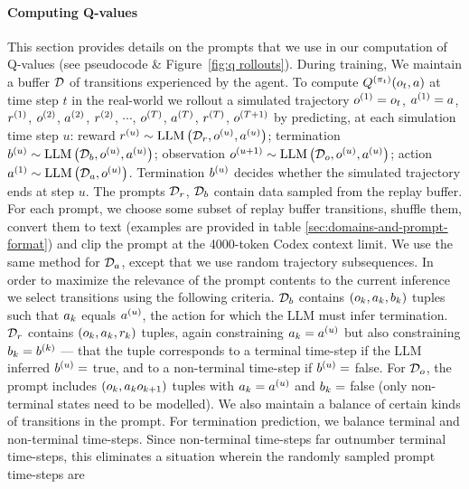 \documentclass{article}
\DeclareMathOperator*{\LLM}{LLM}
\begin{document}
\paragraph{Computing Q-values}\label{para:q-values} This section provides
details on the prompts that we use in our computation of Q-values (see
 pseudocode \& Figure~\ref{fig:q rollouts}). During training, We
maintain a buffer $\mathcal{D}$ of transitions experienced by the agent. To compute
$\Q^{\Policy_t}(\Obs_t, \Act)$ at time step $t$ in the real-world we rollout a
simulated trajectory $\Obs^{1}=\Obs_t$, $\Act^{1} = \Act$, $\Rew^{1}$,
$\Obs^{2}$, $\Act^{2}$, $\Rew^{2}$, $\cdots$, $\Obs^{T}$, $\Act^{T}$,
$\Rew^{T}$, $\Obs^{T+1}$ by predicting, at each simulation time step $u$: reward
$\Rew^{u} \sim \LLM\left( \Buffer_{\Rew},\Obs^{u},\Act^{u} \right)$; termination
$\Ter^{u} \sim \LLM\left( \Buffer_{\Ter},\Obs^{u},\Act^{u} \right)$; observation
$\Obs^{u+1} \sim \LLM\left( \Buffer_{\Obs},\Obs^{u},\Act^{u} \right)$; action
$\Act^{1} \sim \LLM\left( \BestTrajectories,\Obs^{u} \right)$. Termination
$\Ter^{u}$ decides whether the simulated trajectory ends at step $u$.
The prompts $\Buffer_{\Rew}$, $\Buffer_{\Ter}$ contain data sampled from the
replay buffer. For each prompt, we choose some subset of replay buffer
transitions, shuffle them, convert them to text (examples are provided in table
\ref{sec:domains-and-prompt-format}) and clip the prompt at the 4000-token
Codex context limit. We use the same method for $\Buffer_{\Act}$, except that we
use random trajectory subsequences.
In order to maximize the relevance of the prompt contents to the current
inference we select transitions using the following criteria. $\Buffer_{\Ter}$
contains $(\Obs_k, \Act_{k}, \Ter_{k})$ tuples such that $\Act_{k}$ equals
$\Act^{u}$, the action for which the LLM must infer termination.
$\Buffer_{\Rew}$ contains $(\Obs_k, \Act_{k}, \Rew_{k})$ tuples, again
constraining  $\Act_{k} = \Act^{u}$ but also constraining $\Ter_{k} = \Ter^{k}$
--- that the tuple corresponds to a terminal time-step if the LLM inferred
$\Ter^{u} =$ true, and to a non-terminal time-step if $\Ter^{u} =$ false. For
$\Buffer_{\Obs}$, the prompt includes $(\Obs_k, \Act_{k} \Obs_{k+1})$ tuples
with $\Act_{k} = \Act^{u}$ and $\Ter_{k} =$ false (only non-terminal states need
to be modelled).
We also maintain a balance of certain kinds of transitions in the prompt. For
termination prediction, we balance terminal and non-terminal time-steps.
Since non-terminal time-steps far outnumber terminal time-steps, this
eliminates a situation wherein the randomly sampled prompt time-steps are
\end{document}
